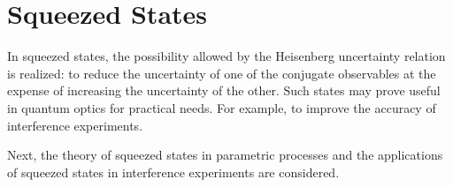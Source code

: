 \chapter{Squeezed States}
\label{chSqueezed}
In squeezed states, the possibility allowed by the Heisenberg uncertainty relation is realized: to reduce the uncertainty of one of the conjugate observables at the expense of increasing the uncertainty of the other. Such states may prove useful in quantum optics for practical needs. For example, to improve the accuracy of interference experiments.

Next, the theory of squeezed states in parametric processes and the applications of squeezed states in interference experiments are considered.









